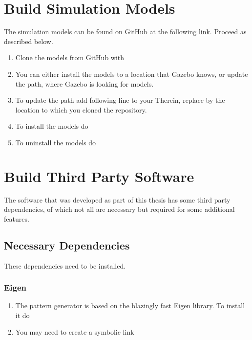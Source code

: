 \section{Build Simulation Models}
\label{sec::A4_sm}
The simulation models can be found on GitHub at the following \href{https://github.com/mhubii/gazebo_models/}{link}. Proceed as described below.
\begin{enumerate}
	\item Clone the models from GitHub with
	\newline {}
	\item You can either install the models to a location that Gazebo knows, or update the path, where Gazebo is looking for models.
	\item To update the path add following line to your 
	\newline {}
	\newline Therein, replace \inlinecode{}{<>} by the location to which you cloned the repository.
	\item To install the models do
	\newline {}
	\newline {}
	\newline {}
	\item To uninstall the models do
	\newline {}
	\newline {}
\end{enumerate}
\section{Build Third Party Software}
\label{sec::A5_tp}
The software that was developed as part of this thesis has some third party dependencies, of which not all are necessary but required for some additional features.
\subsection{Necessary Dependencies}
\label{sec::A51_nd}
These dependencies need to be installed.
\subsubsection{Eigen}
\begin{enumerate}
	\item The pattern generator is based on the blazingly fast Eigen library. To install it do
	\newline {}
	\item You may need to create a symbolic link
	\newline {}
	\newline {}
\end{enumerate}
